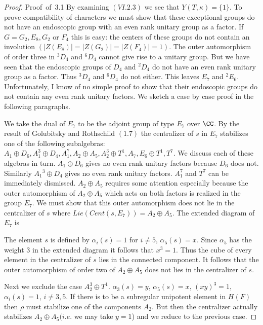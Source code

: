 \documentclass{memo-l}
\theoremstyle{definition}
\theoremstyle{remark}
\numberwithin{section}{chapter}
\numberwithin{equation}{chapter}
\begin{document}
\begin{proof} {Proof\ of\ 3.1}
By examining $(VI.2.3)$ we see that $Y(T,{\kappa})  =  \{1\}$.  To prove
compatibility of characters we must show that these exceptional groups do
not have an endoscopic group with an even rank unitary group as a factor.
If $G  =  G_{2},E_{8},G_{2}$ or $F_{4}$ this is easy: the centers of these
groups do not contain an involution $(\vert Z(E_{8})\vert  =  \vert
Z(G_{2})\vert  =  \vert Z(F_{4})\vert  =  1)$.  The outer automorphism of order
three in ${}^{3}D_{4}$ and ${}^{6}D_{4}$ cannot give rise to a unitary group.
But we have seen that the endoscopic groups of $D_{4}$ and ${}^{2}D_{4}$ do
not have an even rank unitary group as a factor.  Thus ${}^{3}D_{4}$ and
${}^{6}D_{4}$ do not either.  This leaves $E_{7}$ and ${}^{2}E_{6}$.
Unfortunately, I know of no simple proof to show that their endoscopic
groups do not contain any even rank unitary factors.  We sketch a case by
case proof in the following paragraphs.

 We take the dual of $E_{7}$ to be the adjoint group of type
$E_{7}$ over ${\CC}$.  By the result of Golubitsky and Rothschild
$(1.7)$ the centralizer of $s$ in $E_{7}$ stabilizes one of the following
subalgebras: $A_{1}\oplus D_{6}, A_{1}^{3}\oplus D_{4}, A_{1}^{7}, A_{2}\oplus A_{5},
A_{2}^{3}\oplus T^{1}, A_{7}, E_{6}\oplus T^{1}, T^{7}$.  We discuss each of these
algebras in turn.  $A_{1}\oplus D_{6}$ gives no even rank unitary factors
because $D_{6}$ does not.  Similarly $A_{1}{}^{3}\oplus D_{4}$ gives no even rank
unitary factors.  $A_{1}^{7}$ and $T^{7}$ can be immediately dismissed.
$A_{2}\oplus A_{5}$ requires some attention especially because the outer
automorphism of $A_{2}\oplus A_{5}$ which acts on both factors is realized in
the group $E_{7}$.  We must show that this outer automorphism does not lie
in the centralizer of $s$ where $Lie(Cent(s,E_{7}))  =  A_{2}\oplus A_{5}$.  The
extended diagram of $E_{7}$ is
\enddefinition

\medskip

The element $s$ is defined by ${\alpha}_{i}(s) = 1$ for $i \ne 5$,
${\alpha}_{5}(s) = x$.  Since ${\alpha}_{5}$ has the weight $3$ in the
extended diagram it follows that $x^{3} = 1$.  Thus the cube of every element
in the centralizer of $s$ lies in the connected component.  It follows that
the outer automorphism of order two of $A_{2}\oplus A_{5}$ does not lies in the
centralizer of $s$.
 

   Next we exclude the case $A_{2}^{3}\oplus T^{1}$.  ${\alpha}_{3}(s) = y$,
${\alpha}_{5}(s) = x$, $(xy)^{3} = 1$, ${\alpha}_{i}(s) = 1$, $i \ne 3,5$.  
If there is
to be a subregular unipotent element in $H(F)$ then ${\rho }$ must
stabilize one of the components $A_{2}$.  But then the centralizer actually
stabilizes $A_{2}\oplus A_{5} (i.e$.  we may take $y = 1$) and we reduce to the
previous case.


\end{proof}
\end{document}
